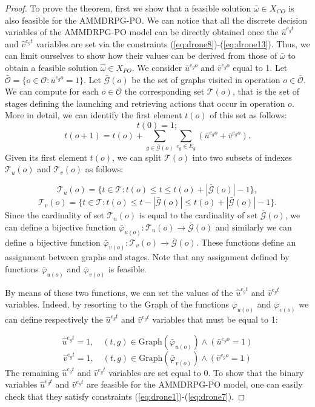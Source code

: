 \documentclass[10pt,a4paper]{elsarticle}
\def\AMDPO{{\sf AMMDRPG-PO\xspace}}
\newcommand{\EN}[1]{{\color{black}#1}}
\begin{document}
\begin{proof}
To prove the theorem, first we show that a feasible solution $\bar{\omega} \in X_{CO}$ is also feasible for the \AMDPO. 
We can notice that all the discrete decision variables of the \AMDPO\xspace model can be directly obtained once the $\hat{u}^{e_gt}$ and $\hat{v}^{e_gt}$ variables are set via the constraints (\ref{eq:drone8})-(\ref{eq:drone13}). Thus, we can limit ourselves to show how their values can be derived from \EN{those} of $\bar{\omega}$ to obtain a feasible solution $\hat{\omega} \in X_{PO}$.
We consider $\bar{u}^{e_go}$ and $\bar{v}^{e_go}$ equal to 1.
Let $\bar{\mathcal O}= \{o \in \mathcal O: \bar{u}^{e_go}=1\}$.
Let $\mathcal {\bar{G}}(o)$ be the set of graphs visited in operation $o \in \bar{\mathcal O}$.
We can compute for each $ o \in \bar{\mathcal O}$ the corresponding set $\mathcal T(o)$, that is the set of stages defining the launching and retrieving actions that occur in operation $o$.
More in detail, we can identify the first element $t(o)$ of this set  
as follows:\\ 
$$
t(0)= 1;
$$
$$
t(o+1)= t(o) + \sum_{g \in \mathcal {\bar{G}}(o)}\sum_{e_g \in E_g} (\bar{u}^{e_go} + \bar{v}^{e_go}).
$$
\noindent
Given its first element $t(o)$, we can split $\mathcal T(o)$ into two subsets of indexes $\mathcal T_u(o)$ and $\mathcal T_v(o)$ as follows:

$$
\mathcal T_u(o)= \{ t \in \mathcal T: t(o) \leq t \leq t(o) + |\mathcal{\bar{G}}(o)| - 1 \},
$$
$$
\mathcal T_v(o)= \{ t \in \mathcal T: t(o) \leq t - |\mathcal {\bar{G}}(o)| \leq t(o) + |\mathcal {\bar{G}}(o)| - 1 \}.
$$
\noindent
Since the cardinality of set $\mathcal T_u(o)$ is equal to \EN{the} cardinality of set $\mathcal{\bar{G}}(o)$, we can define a bijective function $\bar\varphi_{u(o)}:\mathcal T_u(o) \rightarrow \mathcal{\bar{G}}(o)$ and similarly we can define a bijective function $\bar\varphi_{v(o)}:\mathcal T_v(o) \rightarrow \mathcal{\bar{G}}(o)$. These functions define an assignment between graphs and stages. Note that any assignment defined by functions $\bar\varphi_{u(o)}$ and $\bar\varphi_{v(o)}$ is feasible.

By means of these two functions, we can set the values of the $\hat{u}^{e_gt}$ and $\hat{v}^{e_gt}$ variables. Indeed, by resorting to the Graph of the functions $\bar\varphi_{u(o)}$ and $\bar\varphi_{v(o)}$ we can define respectively the $\hat{u}^{e_gt}$ and $\hat{v}^{e_gt}$ variables that must be equal to 1:

$$
\hat{u}^{e_gt} = 1, \quad (t,g) \in \mbox{Graph}(\bar\varphi_{u(o)}) \wedge (\bar{u}^{e_go}=1) 
$$
$$
\hat{v}^{e_gt} = 1, \quad (t,g) \in \mbox{Graph}(\bar\varphi_{v(o)})  \wedge (\bar{v}^{e_go}=1) 
$$
The remaining $\hat{u}^{e_gt}$ and $\hat{v}^{e_gt}$ variables are set equal to 0.
To show that the binary variables $\hat{u}^{e_gt}$ and $\hat{v}^{e_gt}$ are feasible for the \AMDPO\xspace model, one can easily check that they satisfy constraints (\ref{eq:drone1})-(\ref{eq:drone7}).


\end{proof}
\end{document}
